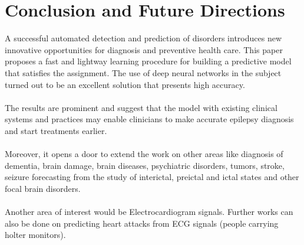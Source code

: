 \documentclass{llncs}       %
\begin{document}
\paragraph{}\paragraph{}
\paragraph{}\paragraph{}


\section{Conclusion and Future Directions}
\label{sec:4}



 A successful automated detection and prediction of disorders introduces new innovative opportunities for diagnosis and preventive health care. This paper proposes a fast and lightway learning procedure for building a predictive model that satisfies the assignment. The use of deep neural networks in the subject turned out to be an excellent solution that presents high accuracy.  
\paragraph{}
The results are prominent and suggest that the model with existing clinical systems and practices may enable clinicians to make accurate epilepsy diagnosis and start  treatments earlier.
\paragraph{}
Moreover, it opens a door to extend the work on other areas like diagnosis of dementia, brain damage, brain diseases, psychiatric disorders, tumors, stroke, seizure forecasting from the study of interictal, preictal and ictal states and other focal brain disorders. 
\paragraph{}
Another area of interest would be Electrocardiogram signals. Further works can also be done on predicting heart attacks from ECG signals (people carrying holter monitors). 
\end{document}
